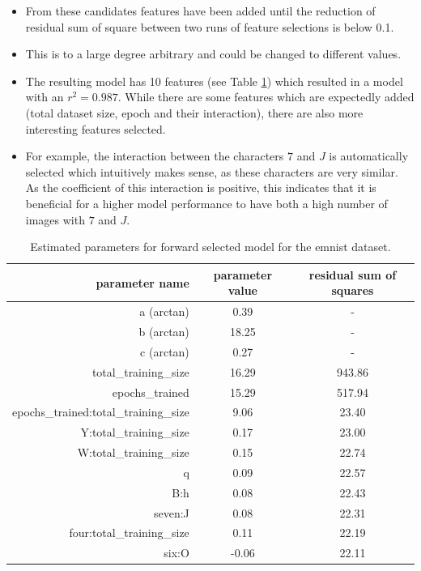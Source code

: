 \documentclass{article} %
\begin{document}
\begin{itemize}
    \item From these candidates features have been added until the reduction of residual sum of square between two runs of feature selections is below 0.1.
    \item This is to a large degree arbitrary and could be changed to different values.  
    \item The resulting model has 10 features (see Table \ref{table:param_values_emnist}) which resulted in a model with an $r^2 = 0.987$. While there are some features which are expectedly added (total dataset size, epoch and their interaction), there are also more interesting features selected.
    \item For example, the interaction between the characters $7$ and $J$ is automatically selected which intuitively makes sense, as these characters are very similar. As the coefficient of this interaction is positive, this indicates that it is beneficial for a higher model performance to have both a high number of images with $7$ and $J$.
\end{itemize}


\begin{table}[h!]
    \centering
\begin{tabular}{r|c|c}

    parameter name &  parameter value &    residual sum of squares \\
    \hline
    a (arctan)                                  &         0.39 &    -    \\
    b (arctan)                                  &        18.25 &    -    \\
    c (arctan)                                  &         0.27 &    -    \\
    total\_training\_size                &        16.29 & 943.86 \\
    epochs\_trained                     &        15.29 & 517.94 \\
    epochs\_trained:total\_training\_size &         9.06 &  23.40 \\
    Y:total\_training\_size              &         0.17 &  23.00 \\
    W:total\_training\_size              &         0.15 &  22.74 \\
    q                                  &         0.09 &  22.57 \\
    B:h                                &         0.08 &  22.43 \\
    seven:J                            &         0.08 &  22.31 \\
    four:total\_training\_size           &         0.11 &  22.19 \\
    six:O                              &        -0.06 &  22.11 \\
    \end{tabular}
\caption{Estimated parameters for forward selected model for the emnist dataset.}
\label{table:param_values_emnist}
\end{table}
\end{document}
